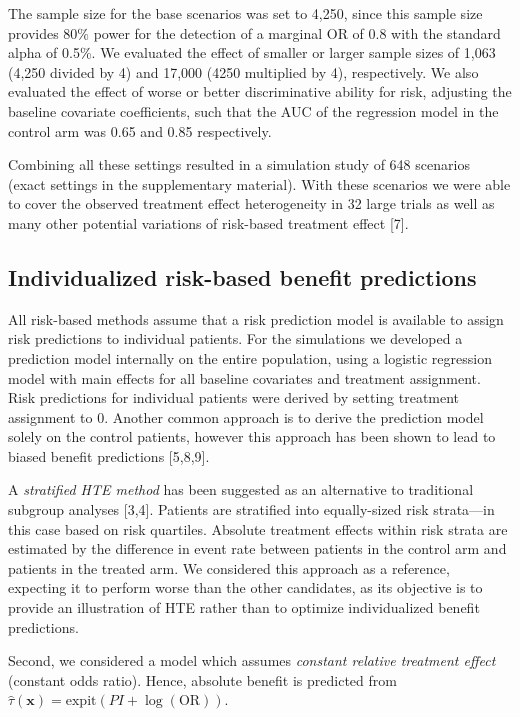 \documentclass[]{elsarticle} %
\begin{document}
The sample size for the base scenarios was set to 4,250, since this
sample size provides \(80\%\) power for the detection of a marginal OR
of 0.8 with the standard alpha of 0.5\%. We evaluated the effect of
smaller or larger sample sizes of 1,063 (4,250 divided by 4) and 17,000
(4250 multiplied by 4), respectively. We also evaluated the effect of
worse or better discriminative ability for risk, adjusting the baseline
covariate coefficients, such that the AUC of the regression model in the
control arm was 0.65 and 0.85 respectively.

Combining all these settings resulted in a simulation study of 648
scenarios (exact settings in the supplementary material). With these
scenarios we were able to cover the observed treatment effect
heterogeneity in 32 large trials as well as many other potential
variations of risk-based treatment effect {[}7{]}.

\hypertarget{individualized-risk-based-benefit-predictions}{%
\subsection{Individualized risk-based benefit
predictions}\label{individualized-risk-based-benefit-predictions}}

All risk-based methods assume that a risk prediction model is available
to assign risk predictions to individual patients. For the simulations
we developed a prediction model internally on the entire population,
using a logistic regression model with main effects for all baseline
covariates and treatment assignment. Risk predictions for individual
patients were derived by setting treatment assignment to 0. Another
common approach is to derive the prediction model solely on the control
patients, however this approach has been shown to lead to biased benefit
predictions {[}5,8,9{]}.

A \emph{stratified HTE method} has been suggested as an alternative to
traditional subgroup analyses {[}3,4{]}. Patients are stratified into
equally-sized risk strata---in this case based on risk quartiles.
Absolute treatment effects within risk strata are estimated by the
difference in event rate between patients in the control arm and
patients in the treated arm. We considered this approach as a reference,
expecting it to perform worse than the other candidates, as its
objective is to provide an illustration of HTE rather than to optimize
individualized benefit predictions.

Second, we considered a model which assumes \emph{constant relative
treatment effect} (constant odds ratio). Hence, absolute benefit is
predicted from
\(\hat{\tau}(\bm{x}) = \text{expit}(PI +\log(\text{OR}))\).
\end{document}
